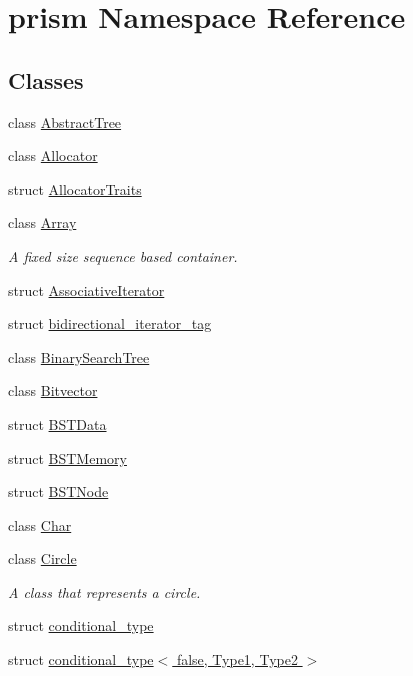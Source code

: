 \hypertarget{namespaceprism}{}\section{prism Namespace Reference}
\label{namespaceprism}
\subsection*{Classes}
\begin{DoxyCompactItemize}
\item 
class \hyperlink{classprism_1_1_abstract_tree}{Abstract\+Tree}
\item 
class \hyperlink{classprism_1_1_allocator}{Allocator}
\item 
struct \hyperlink{structprism_1_1_allocator_traits}{Allocator\+Traits}
\item 
class \hyperlink{classprism_1_1_array}{Array}
\begin{DoxyCompactList}\small\item\em A fixed size sequence based container. \end{DoxyCompactList}\item 
struct \hyperlink{structprism_1_1_associative_iterator}{Associative\+Iterator}
\item 
struct \hyperlink{structprism_1_1bidirectional__iterator__tag}{bidirectional\+\_\+iterator\+\_\+tag}
\item 
class \hyperlink{classprism_1_1_binary_search_tree}{Binary\+Search\+Tree}
\item 
class \hyperlink{classprism_1_1_bitvector}{Bitvector}
\item 
struct \hyperlink{structprism_1_1_b_s_t_data}{B\+S\+T\+Data}
\item 
struct \hyperlink{structprism_1_1_b_s_t_memory}{B\+S\+T\+Memory}
\item 
struct \hyperlink{structprism_1_1_b_s_t_node}{B\+S\+T\+Node}
\item 
class \hyperlink{classprism_1_1_char}{Char}
\item 
class \hyperlink{classprism_1_1_circle}{Circle}
\begin{DoxyCompactList}\small\item\em A class that represents a circle. \end{DoxyCompactList}\item 
struct \hyperlink{structprism_1_1conditional__type}{conditional\+\_\+type}
\item 
struct \hyperlink{structprism_1_1conditional__type_3_01false_00_01_type1_00_01_type2_01_4}{conditional\+\_\+type$<$ false, Type1, Type2 $>$}

\end{DoxyCompactItemize}
